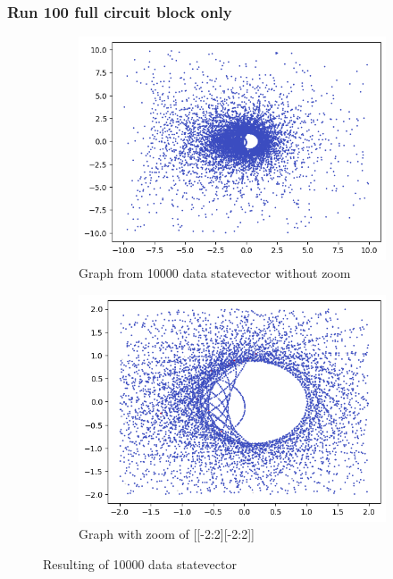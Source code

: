 \subsubsection{Run 100 full circuit block only}
\begin{figure}[ht!]
        \centering
        \begin{subfigure}[c]{0.5\textwidth}
                \includegraphics[width=\textwidth]{Chapitre1/Figures/exp1_100_base0_nonZoom.png}
                \caption{Graph from 10000 data statevector without zoom}
        \end{subfigure}%
        \begin{subfigure}[c]{0.5\textwidth}
                \includegraphics[width=\textwidth]{Chapitre1/Figures/exp1_100_base0_zoom.png}
                \caption{Graph with zoom of [[-2:2][-2:2]]}
        \end{subfigure}
        \caption{Resulting of 10000 data statevector}
\end{figure}




